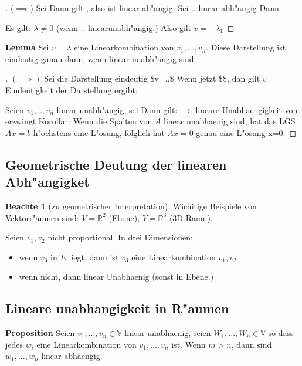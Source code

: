 \documentclass[11pt]{article}
\theoremstyle{remark}
\theoremstyle{definition}
\newtheorem*{notte}{Beachte}
\theoremstyle{remark}
\begin{document}
\begin{proof}[] \label{}
(\(\implies\)) Sei Dann gilt , also ist linear ab"angig.
Sei .. linear abh"angig  Dann 

Es gilt: \(\lambda \not= 0\) (wenn  .. linearunabh"angig.) Also gilt \(v=-\lambda_1\)
\end{proof}

\textbf{Lemma} Sei \(v=\lambda\) eine Linearkombination von \(v_1,...,v_n\). Diese
Darstellung ist eindeutig ganau dann, wenn linear unabh"angig sind.

\begin{proof}[] \label{}
\((\implies)\) Sei die Darstellung eindeutig \$v=..\$ Wenn jetzt \$\$, dan gilt \(v=\)
Eindeutigkeit der Darstellung ergibt:

Seien \(v_1,..,v_n\) linear unabh"angig, sei 
Dann gilt: \(\rightarrow\) lineare Unabhaengigkeit von erzwingt Korollar: Wenn die
Spalten von \(A\) linear unabhaenig sind, hat das LGS \(Ax=b\) h"ochstens eine
L"osung, folglich hat \(Ax=0\) genau eine L"osung x=0.
\end{proof}

\subsection{Geometrische Deutung der linearen Abh"angigket}
\label{sec:org95b9a1d}
\begin{notte}[zu geometrischer Interpretation] \label{}
Wichitige Beispiele von Vektorr"aumen sind: \(V=\mathbb{R}^2\) (Ebene),
\(V=\mathbb{R}^3\) (3D-Raum).
\end{notte}

Seien \(v_1, v_2\) nicht proportional.
In drei Dimensionen:
\begin{relation}
\begin{itemize}
\item wenn \(v_3\) in \(E\) liegt, dann ist \(v_3\) eine Linearkombination \(v_1, v_2\)
\item wenn nicht, dann linear Unabhaenig (sonst in Ebene.)
\end{itemize}
\end{relation}

\subsection{Lineare unabhangigkeit in R"aumen}
\label{sec:orgea5b4b9}
\textbf{Proposition} Seien \(v_1,...,v_n \in \mathbb{V}\) linear unabhaenig, seien \(W_1,
..., W_n \in \mathbb{V}\) so dass jedes \(w_i\) eine Linearkombination von
\(v_1,...,v_n\) ist. Wenn \(m>n\), dann sind \(w_1,...,w_n\) linear abhaengig.
\end{document}
